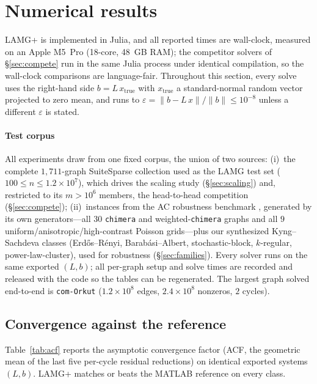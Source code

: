 \documentclass{siamart220329}
\begin{document}
\section{Numerical results}\label{sec:results}
LAMG+ is implemented in Julia, and all reported times are wall-clock, measured on an Apple M5~Pro
(18-core, 48~GB RAM); the competitor solvers of \S\ref{sec:compete} run in the same Julia process
under identical compilation, so the wall-clock comparisons are language-fair.
Throughout this section, every solve uses the right-hand side $b=L\,x_{\mathrm{true}}$ with
$x_{\mathrm{true}}$ a standard-normal random vector projected to zero mean, and runs to
$\varepsilon=\|b-L\,x\|/\|b\|\le10^{-8}$ unless a different $\varepsilon$ is stated.

\paragraph{Test corpus} All experiments draw from one fixed corpus, the union of two sources:
(i)~the complete $1{,}711$-graph SuiteSparse collection used as the LAMG test set
($100\le n\le1.2\!\times\!10^7$), which drives the scaling study (\S\ref{sec:scaling}) and, restricted
to its $m>10^6$ members, the head-to-head competition (\S\ref{sec:compete});
(ii)~instances from the AC robustness benchmark \cite{gks2023}, generated by its
own generators---all $30$ \texttt{chimera} and weighted-\texttt{chimera} graphs and all $9$
uniform/anisotropic/high-contrast Poisson grids---plus our synthesized Kyng--Sachdeva classes
(Erd\H{o}s--R\'enyi, Barab\'asi--Albert, stochastic-block, $k$-regular, power-law-cluster), used for
robustness (\S\ref{sec:families}). Every solver runs on the same exported $(L,b)$; all per-graph setup and solve
times are recorded and released with the code \cite{lamgplus-code} so the tables can be regenerated. The largest graph
solved end-to-end is \texttt{com-Orkut} ($1.2\!\times\!10^8$ edges, $2.4\!\times\!10^8$ nonzeros,
$2$ cycles).

\subsection{Convergence against the reference}\label{sec:acf}
Table~\ref{tab:acf} reports the asymptotic convergence factor (ACF, the geometric mean of
the last five per-cycle residual reductions) on identical exported systems $(L,b)$. LAMG+
matches or beats the MATLAB reference on every class.
\end{document}

